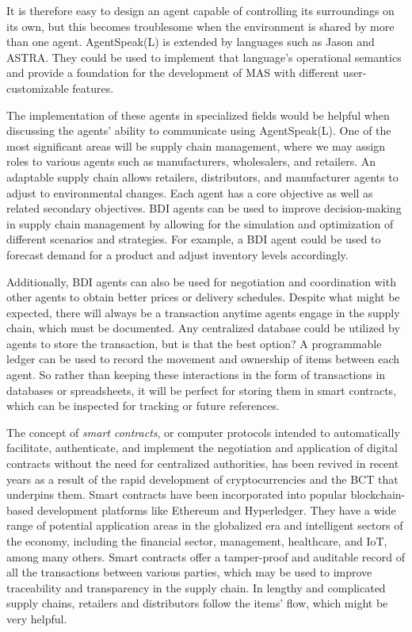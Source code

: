 It is therefore easy to design an agent capable of controlling its surroundings on its own, but this becomes troublesome when the environment is shared by more than one agent. AgentSpeak(L) is extended by languages such as Jason and ASTRA. They could be used to implement that language's operational semantics and provide a foundation for the development of \ac{MAS} with different user-customizable features.

\vspace{.5cm}

The implementation of these agents in specialized fields would be helpful when discussing the agents' ability to communicate using AgentSpeak(L). One of the most significant areas will be supply chain management, where we may assign roles to various agents such as manufacturers, wholesalers, and retailers. An adaptable supply chain allows retailers, distributors, and manufacturer agents to adjust to environmental changes. Each agent has a core objective as well as related secondary objectives. \ac{BDI} agents can be used to improve decision-making in supply chain management by allowing for the simulation and optimization of different scenarios and strategies. For example, a \ac{BDI} agent could be used to forecast demand for a product and adjust inventory levels accordingly. 

\vspace{.5cm}

Additionally, \ac{BDI} agents can also be used for negotiation and coordination with other agents to obtain better prices or delivery schedules. Despite what might be expected, there will always be a transaction anytime agents engage in the supply chain, which must be documented. Any centralized database could be utilized by agents to store the transaction, but is that the best option? A programmable ledger can be used to record the movement and ownership of items between each agent. So rather than keeping these interactions in the form of transactions in databases or spreadsheets, it will be perfect for storing them in smart contracts, which can be inspected for tracking or future references.	

\vspace{.5cm}

The concept of \textit{smart contracts}, or computer protocols intended to automatically facilitate, authenticate, and implement the negotiation and application of digital contracts without the need for centralized authorities, has been revived in recent years as a result of the rapid development of cryptocurrencies and the \ac{BCT} that underpins them. Smart contracts have been incorporated into popular blockchain-based development platforms like Ethereum and Hyperledger. They have a wide range of potential application areas in the globalized era and intelligent sectors of the economy, including the financial sector, management, healthcare, and \ac{IoT}, among many others. Smart contracts offer a tamper-proof and auditable record of all the transactions between various parties, which may be used to improve traceability and transparency in the supply chain. In lengthy and complicated supply chains, retailers and distributors follow the items' flow, which might be very helpful.


